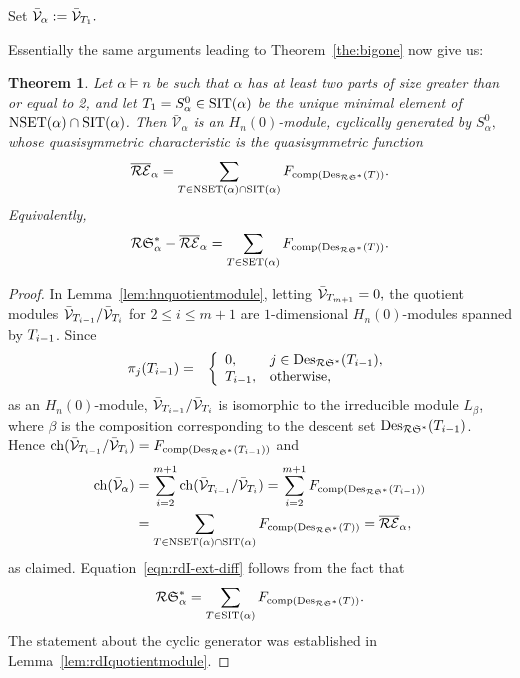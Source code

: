 \documentclass[12pt,letterpaper]{amsart}
\newtheorem{theorem}{Theorem}[section]
\theoremstyle{definition}
\DeclareMathOperator{\comp}{comp}
\newcommand{\rdI}{\mathcal{R}\mathfrak{S}^*}
\DeclareMathOperator{\Des}{Des}
\newcommand{\SET}{\ensuremath{\operatorname{SET}}} \newcommand{\NSET}{\ensuremath{\operatorname{NSET}}}\newcommand{\SRCT}{\ensuremath{\operatorname{SRCT}}}
\newcommand{\hn}{H_n(0)}
\begin{document}
Set $\mathcal{\bar V}_{\alpha}:= \mathcal{\bar V}_{{T}_1}.$

Essentially the same arguments  leading to  Theorem~\ref{the:bigone} now give us:

\begin{theorem}\label{thm:another-bigone}
Let $\alpha \vDash n$ be such that $\alpha$ has at least two parts of size greater than or equal to 2, and let ${T} _1=S^0_\alpha \in \operatorname{SIT} (\alpha)$ be the unique minimal element of $\NSET(\alpha)\cap\SIT(\alpha) $. Then $\mathcal{\bar V}_{\alpha}$ is an $\hn$-module, cyclically generated by $S^0_\alpha,$ whose quasisymmetric characteristic is the quasisymmetric function 
\begin{equation}\label{eq:new-ext-Schur}\overline{\mathcal{R}\mathcal{E}}_\alpha= \sum_{T\in \NSET(\alpha)\cap\SIT(\alpha)} F_{\mathrm{comp}(\Des_{\rdI}(T))}.\end{equation} 
Equivalently,
\begin{equation}\label{eqn:rdI-ext-diff} \rdI_\alpha-\overline{\mathcal{R}\mathcal{E}}_\alpha=\sum_{\rtau \in \SET(\alpha)}F_{\comp(\desri(\rtau))}.\end{equation}
\end{theorem}
\begin{proof} In Lemma~\ref{lem:hnquotientmodule}, letting $\mathcal{\bar V}_{{T}_{m+1}}=0,$ the quotient modules $\mathcal{\bar V}_{{T}_{i-1}}/\mathcal{\bar V}_{{T}_{i}}$ for $2\leq i\leq m+1$ are $1$-dimensional $\hn$-modules spanned by ${T}_{i-1}$.
Since
\begin{eqnarray*}
\pi_{j}({T}_{i-1})&=& \left \lbrace \begin{array}{ll}0, & j\in \mathrm{Des}_{\mathcal{R}\mathfrak{S}^\ast}({T}_{i-1}),\\{T}_{i-1}, & \text{otherwise,}\end{array}\right.
\end{eqnarray*}
 as an $\hn$-module, $\mathcal{\bar V}_{{T}_{i-1}}/\mathcal{\bar V}_{{T}_{i}}$ is isomorphic to the irreducible module $L_{\beta}$, where $\beta$ is the composition corresponding to the descent set $\mathrm{Des}_{\mathcal{R}\mathfrak{S}^\ast}({T}_{i-1})$. 
Hence 
$\mathrm{ch}(\mathcal{\bar V}_{\rtau_{i-1}}/\mathcal{\bar V}_{\rtau_{i}})=F_{\comp(\desri(\rtau_{i-1}))}$
and 
\begin{eqnarray*}
\mathrm{ch}(\mathcal{\bar V}_{\alpha})&=\displaystyle\sum_{i=2}^{m+1}\mathrm{ch}(\mathcal{\bar V}_{\rtau_{i-1}}/\mathcal{\bar V}_{\rtau_{i}})= \displaystyle \sum_{i=2}^{m+1}F_{\comp(\desri(\rtau_{i-1}))}\nonumber\\ 
&= \displaystyle \sum_{\rtau \in \NSET(\alpha)\cap\SIT(\alpha)}F_{\comp(\desri(\rtau))}= \overline{\mathcal{R}\mathcal{E}}_\alpha,
\end{eqnarray*}
as claimed.  Equation~\eqref{eqn:rdI-ext-diff} follows from the fact that 
\[\rdI_\alpha= \sum_{\rtau \in \SIT(\alpha)}F_{\comp(\desri(\rtau))}.\] The statement about the cyclic generator was established in Lemma~\ref{lem:rdIquotientmodule}. \end{proof}
\end{document}
